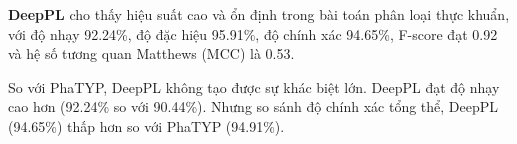 \textbf{DeepPL} cho thấy hiệu suất cao và ổn định trong bài toán phân loại thực khuẩn, với độ nhạy 92.24\%, độ đặc hiệu 95.91\%, độ chính xác 94.65\%, F-score đạt 0.92 và hệ số tương quan Matthews (MCC) là 0.53.

So với PhaTYP, DeepPL không tạo được sự khác biệt lớn. DeepPL đạt độ nhạy cao hơn (92.24\% so với 90.44\%). Nhưng so sánh độ chính xác tổng thể, DeepPL (94.65\%) thấp hơn so với PhaTYP (94.91\%).